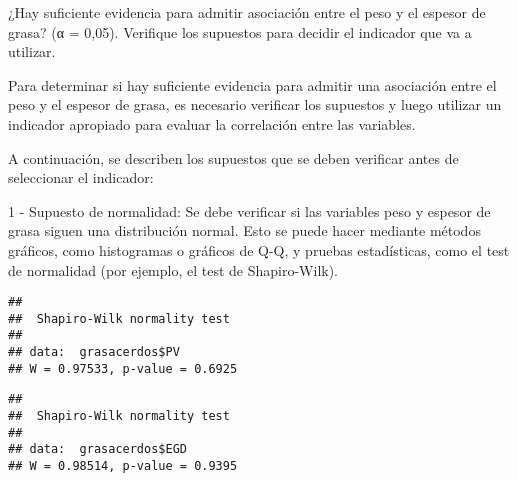 \documentclass[
]{article}
\newenvironment{Shaded}{\begin{snugshade}}{\end{snugshade}}
\newcommand{\AttributeTok}[1]{\textcolor[rgb]{0.77,0.63,0.00}{#1}}
\newcommand{\DecValTok}[1]{\textcolor[rgb]{0.00,0.00,0.81}{#1}}
\newcommand{\FunctionTok}[1]{\textcolor[rgb]{0.00,0.00,0.00}{#1}}
\newcommand{\NormalTok}[1]{#1}
\newcommand{\SpecialCharTok}[1]{\textcolor[rgb]{0.00,0.00,0.00}{#1}}
\newcommand{\StringTok}[1]{\textcolor[rgb]{0.31,0.60,0.02}{#1}}
\begin{document}
¿Hay suficiente evidencia para admitir asociación entre el peso y el
espesor de grasa? (α = 0,05). Verifique los supuestos para decidir el
indicador que va a utilizar.

Para determinar si hay suficiente evidencia para admitir una asociación
entre el peso y el espesor de grasa, es necesario verificar los
supuestos y luego utilizar un indicador apropiado para evaluar la
correlación entre las variables.

A continuación, se describen los supuestos que se deben verificar antes
de seleccionar el indicador:

1 - Supuesto de normalidad: Se debe verificar si las variables peso y
espesor de grasa siguen una distribución normal. Esto se puede hacer
mediante métodos gráficos, como histogramas o gráficos de Q-Q, y pruebas
estadísticas, como el test de normalidad (por ejemplo, el test de
Shapiro-Wilk).

\begin{Shaded}
\end{Shaded}

\begin{verbatim}
## 
##  Shapiro-Wilk normality test
## 
## data:  grasacerdos$PV
## W = 0.97533, p-value = 0.6925
\end{verbatim}

\begin{Shaded}
\end{Shaded}

\begin{verbatim}
## 
##  Shapiro-Wilk normality test
## 
## data:  grasacerdos$EGD
## W = 0.98514, p-value = 0.9395
\end{verbatim}

\begin{Shaded}
\end{Shaded}
\end{document}
